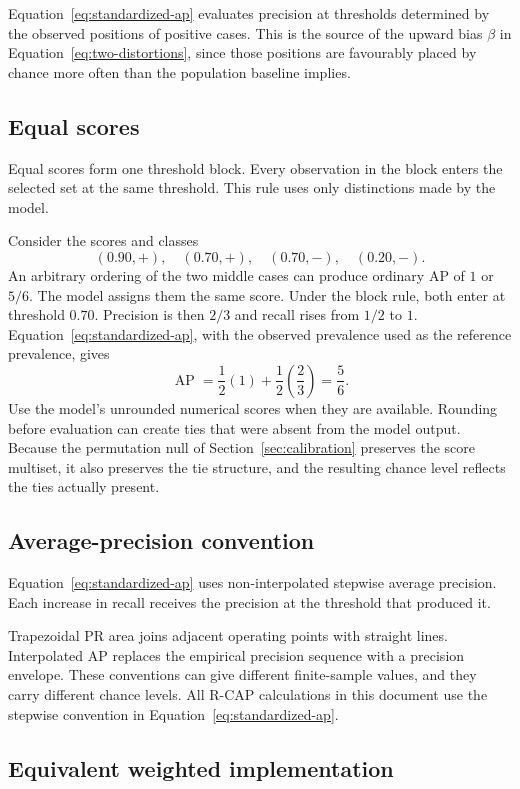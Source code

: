 \documentclass[11pt]{article}
\newcommand{\AP}{\operatorname{AP}}
\theoremstyle{remark}
\begin{document}
Equation~\eqref{eq:standardized-ap} evaluates precision at thresholds determined by the observed positions of positive cases. This is the source of the upward bias $\beta$ in Equation~\eqref{eq:two-distortions}, since those positions are favourably placed by chance more often than the population baseline implies.

\subsection{Equal scores}

Equal scores form one threshold block. Every observation in the block enters the selected set at the same threshold. This rule uses only distinctions made by the model.

Consider the scores and classes
\[
(0.90,+),\quad(0.70,+),\quad(0.70,-),\quad(0.20,-).
\]
An arbitrary ordering of the two middle cases can produce ordinary AP of $1$ or $5/6$. The model assigns them the same score. Under the block rule, both enter at threshold $0.70$. Precision is then $2/3$ and recall rises from $1/2$ to $1$. Equation~\eqref{eq:standardized-ap}, with the observed prevalence used as the reference prevalence, gives
\[
\AP
=
\frac12(1)+\frac12\left(\frac23\right)
=
\frac56.
\]
Use the model's unrounded numerical scores when they are available. Rounding before evaluation can create ties that were absent from the model output. Because the permutation null of Section~\ref{sec:calibration} preserves the score multiset, it also preserves the tie structure, and the resulting chance level reflects the ties actually present.

\subsection{Average-precision convention}

Equation~\eqref{eq:standardized-ap} uses non-interpolated stepwise average precision. Each increase in recall receives the precision at the threshold that produced it.

Trapezoidal PR area joins adjacent operating points with straight lines. Interpolated AP replaces the empirical precision sequence with a precision envelope. These conventions can give different finite-sample values, and they carry different chance levels. All R-CAP calculations in this document use the stepwise convention in Equation~\eqref{eq:standardized-ap}.

\subsection{Equivalent weighted implementation}
\end{document}

